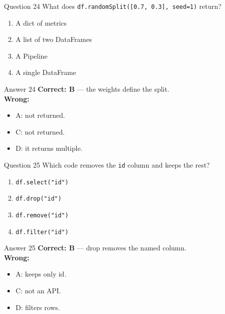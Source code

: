 \documentclass[aspectratio=169,11pt]{beamer}
\begin{document}
\begin{frame}{Question 24}
What does \texttt{df.randomSplit([0.7, 0.3], seed=1)} return?
\begin{enumerate}[label=\Alph*.]
\item A dict of metrics
\item A list of two DataFrames
\item A Pipeline
\item A single DataFrame
\end{enumerate}
\end{frame}
\begin{frame}{Answer 24}
\textbf{Correct: B} --- the weights define the split.\\
\vspace{0.5em}
\textbf{Wrong:}
\begin{itemize}
\item A: not returned.
\item C: not returned.
\item D: it returns multiple.
\end{itemize}
\end{frame}

\begin{frame}{Question 25}
Which code removes the \texttt{id} column and keeps the rest?
\begin{enumerate}[label=\Alph*.]
\item \texttt{df.select("id")}
\item \texttt{df.drop("id")}
\item \texttt{df.remove("id")}
\item \texttt{df.filter("id")}
\end{enumerate}
\end{frame}
\begin{frame}{Answer 25}
\textbf{Correct: B} --- drop removes the named column.\\
\vspace{0.5em}
\textbf{Wrong:}
\begin{itemize}
\item A: keeps only id.
\item C: not an API.
\item D: filters rows.
\end{itemize}
\end{frame}
\end{document}
